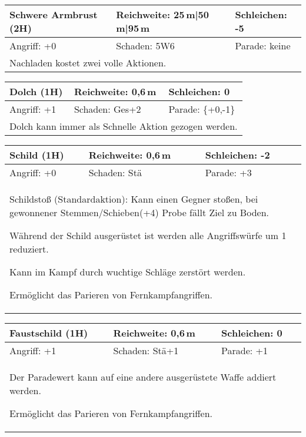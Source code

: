 \documentclass[../../Heldenanleitung2]{subfiles}
\begin{document}
\begin{tabular}{|p{}|p{}|p{}|}
\hline
\textbf{Schwere Armbrust (2H)} & Reichweite: 25\,m|50\,m|95\,m & Schleichen: -5\\
\hline
Angriff: +0 & Schaden: 5W6 & Parade: keine\\
\hline
\multicolumn{3}{|p{0.99\textwidth}|}{Nachladen kostet zwei volle Aktionen.} \\
\hline
\end{tabular}
\newline \newline\newline
\begin{tabular}{|p{}|p{}|p{}|}
\hline
\textbf{Dolch (1H)} & Reichweite: 0,6\,m & Schleichen: 0\\
\hline
Angriff: +1 & Schaden: Ges+2 & Parade: \{+0,-1\}\\
\hline
\multicolumn{3}{|p{0.99\textwidth}|}{Dolch kann immer als Schnelle Aktion gezogen werden.} \\
\hline
\end{tabular}
\newline \newline\newline
\begin{tabular}{|p{}|p{}|p{}|}
\hline
\textbf{Schild (1H)} & Reichweite: 0,6\,m & Schleichen: -2 \\
\hline
Angriff: +0 & Schaden: Stä & Parade: +3\\
\hline
\multicolumn{3}{|p{0.99\textwidth}|}{Schildstoß (Standardaktion): Kann einen Gegner stoßen, bei gewonnener Stemmen/Schieben(+4) Probe fällt Ziel zu Boden. 

Während der Schild ausgerüstet ist werden alle Angriffswürfe um 1 reduziert.

Kann im Kampf durch wuchtige Schläge zerstört werden.

Ermöglicht das Parieren von Fernkampfangriffen.
}\\
\hline
\end{tabular}
\newline \newline\newline
\begin{tabular}{|p{}|p{}|p{}|}
\hline
\textbf{Faustschild (1H)} & Reichweite: 0,6\,m & Schleichen: 0 \\
\hline
Angriff: +1 & Schaden: Stä+1 & Parade: +1\\
\hline
\multicolumn{3}{|p{0.99\textwidth}|}{
Der Paradewert kann auf eine andere ausgerüstete Waffe addiert werden.

Ermöglicht das Parieren von Fernkampfangriffen.
} \\
\hline
\end{tabular}
\end{document}
